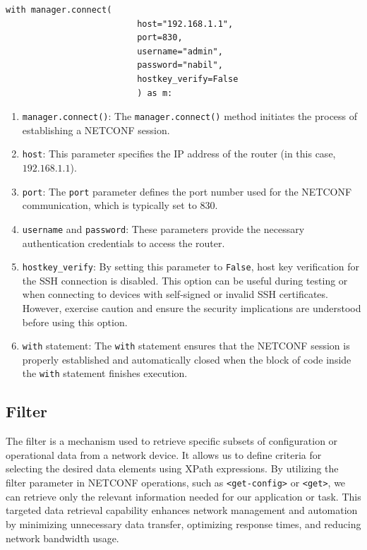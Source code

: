 \begin{lstlisting}[style=pythonStyle, caption={Session establishment.}, backgroundcolor=\color{codebackground}]
                    with manager.connect(
                          host="192.168.1.1",
                          port=830,
                          username="admin", 
                          password="nabil",
                          hostkey_verify=False
                          ) as m:           
\end{lstlisting}


\begin{enumerate}
    \item \texttt{manager.connect()}: The \texttt{manager.connect()} method initiates the process of establishing a NETCONF session.
    \item \texttt{host}: This parameter specifies the IP address of the router (in this case, $192.168.1.1$).
    \item \texttt{port}: The \texttt{port} parameter defines the port number used for the NETCONF communication, which is typically set to 830.
    \item \texttt{username} and \texttt{password}: These parameters provide the necessary authentication credentials to access the router.
    \item \texttt{hostkey\_verify}: By setting this parameter to \texttt{False}, host key verification for the SSH connection is disabled. This option can be useful during testing or when connecting to devices with self-signed or invalid SSH certificates. However, exercise caution and ensure the security implications are understood before using this option.
    \item \texttt{with} statement: The \texttt{with} statement ensures that the NETCONF session is properly established and automatically closed when the block of code inside the \texttt{with} statement finishes execution.
\end{enumerate}
\subsection{Filter}
The filter is a mechanism used to retrieve specific subsets of configuration or operational data from a network device. It allows us to define criteria for selecting the desired data elements using XPath expressions. By utilizing the filter parameter in NETCONF operations, such as \texttt{<get-config>} or \texttt{<get>}, we can retrieve only the relevant information needed for our application or task. This targeted data retrieval capability enhances network management and automation by minimizing unnecessary data transfer, optimizing response times, and reducing network bandwidth usage. 

